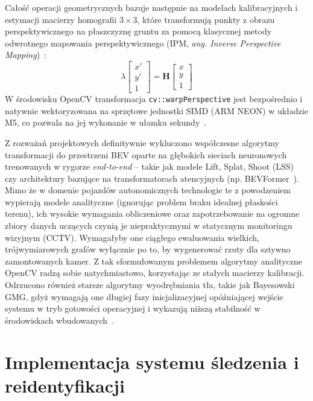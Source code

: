 Całość operacji geometrycznych bazuje następnie na modelach kalibracyjnych i estymacji macierzy
homografii $3 \times 3$, które transformują punkty z obrazu perspektywicznego na płaszczyznę gruntu
za pomocą klasycznej metody odwrotnego mapowania perspektywicznego (IPM, \textit{ang. Inverse
  Perspective Mapping})~\cite{mallot1991}:
\begin{equation}
  \lambda \begin{bmatrix} x' \\ y' \\ 1 \end{bmatrix} = \mathbf{H} \begin{bmatrix} x \\ y \\ 1 \end{bmatrix}
\end{equation}
W środowisku OpenCV transformacja \texttt{cv::warpPerspective} jest bezpośrednio i natywnie wektoryzowana na sprzętowe jednostki SIMD (ARM NEON) w układzie M5, co pozwala na jej wykonanie w ułamku sekundy~\cite{opencv_changelog}.

Z rozważań projektowych definitywnie wykluczono współczesne algorytmy transformacji do przestrzeni
BEV oparte na głębokich sieciach neuronowych trenowanych w rygorze \textit{end-to-end} -- takie jak
modele Lift, Splat, Shoot (LSS)~\cite{philion2020} czy architektury bazujące na transformatorach
atencyjnych (np. BEVFormer~\cite{li2022bevformer}). Mimo że w domenie pojazdów autonomicznych
technologie te z powodzeniem wypierają modele analityczne (ignorując problem braku idealnej
płaskości terenu), ich wysokie wymagania obliczeniowe oraz zapotrzebowanie na ogromne zbiory danych
uczących czynią je niepraktycznymi w statycznym monitoringu wizyjnym (CCTV). Wymagałyby one
ciągłego ewaluowania wielkich, trójwymiarowych grafów wyłącznie po to, by wygenerować rzuty dla
sztywno zamontowanych kamer. Z tak sformułowanym problemem algorytmy analityczne OpenCV radzą sobie
natychmiastowo, korzystając ze stałych macierzy kalibracji. Odrzucono również starsze algorytmy
wyodrębniania tła, takie jak Bayesowski GMG, gdyż wymagają one długiej fazy inicjalizacyjnej
opóźniającej wejście systemu w tryb gotowości operacyjnej i wykazują niższą stabilność w
środowiskach wbudowanych~\cite{opencv_changelog}.

\chapter{Implementacja systemu śledzenia i reidentyfikacji}\label{chap:implementacja}

